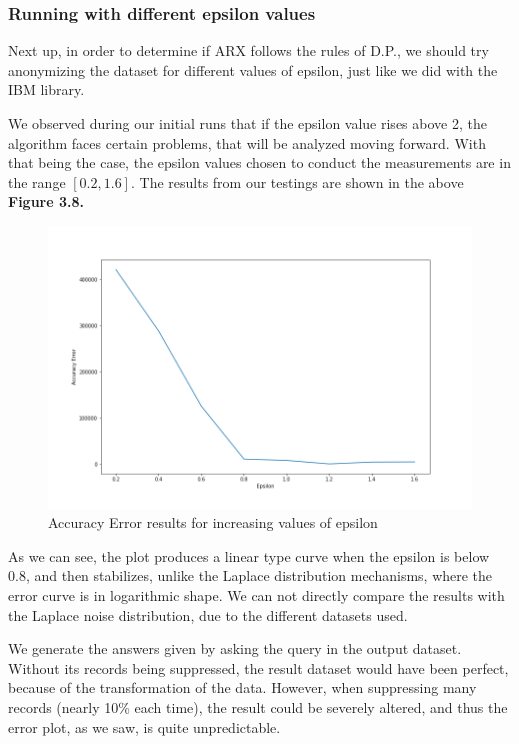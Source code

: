 \subsubsection{Running with different epsilon values}

Next up, in order to determine if ARX follows the rules of D.P., we should try anonymizing the dataset for different values of epsilon, just like we did with the IBM library.

We observed during our initial runs that if the epsilon value rises above 2, the algorithm faces certain problems, that will be analyzed moving forward. With that being the case, the epsilon values chosen to conduct the measurements are in the range $[0.2, 1.6]$. The results from our testings are shown in the above \textbf{Figure 3.8.}

\begin{figure}[!htb]\centering
    \includegraphics[width=1\textwidth]{images/arx_accuracy.png}
    \caption{Accuracy Error results for increasing values of epsilon}
\end{figure}

As we can see, the plot produces a linear type curve when the epsilon is below 0.8, and then stabilizes, unlike the Laplace distribution mechanisms, where the error curve is in logarithmic shape. We can not directly compare the results with the Laplace noise distribution, due to the different datasets used.

We generate the answers given by asking the query in the output dataset. Without its records being suppressed, the result dataset would have been perfect, because of the transformation of the data. However, when suppressing many records (nearly 10\% each time), the result could be severely altered, and thus the error plot, as we saw, is quite unpredictable.


